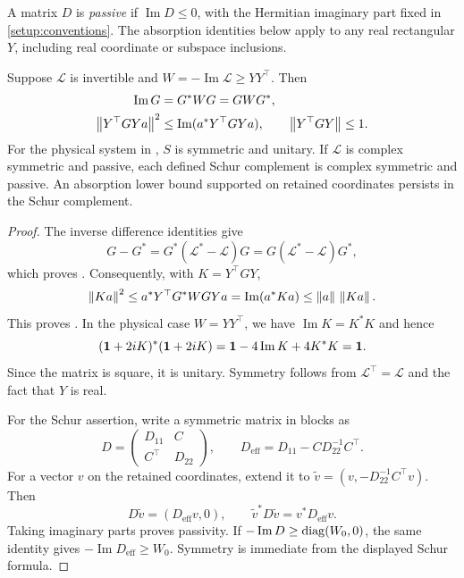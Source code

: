 A matrix $D$ is \emph{passive} if $\operatorname{Im}D\le0$, with the
Hermitian imaginary part fixed in \cref{setup:conventions}. The absorption
identities below apply to any real rectangular $Y$, including real
coordinate or subspace inclusions.

\begin{lemma}\label{mat:ward}
Suppose $\mathscr L$ is invertible and
$W=-\operatorname{Im}\mathscr L\ge YY^\top$. Then
\begin{align}
  \operatorname{Im}G&=G^*WG=GWG^*,
  \label{mat:ward-identity}\\
  \left\lVert Y^\top GYa\right\rVert^2
    &\le \operatorname{Im}(a^*Y^\top GYa),
  \qquad \left\lVert Y^\top GY\right\rVert\le1.
  \label{mat:ward-contraction}
\end{align}
For the physical system in , $S$ is symmetric and
unitary. If $\mathscr L$ is complex symmetric and passive, each defined
Schur complement is complex symmetric and passive. An absorption lower
bound supported on retained coordinates persists in the Schur complement.
\end{lemma}

\begin{proof}
The inverse difference identities give
\[
  G-G^*=G^*(\mathscr L^*-\mathscr L)G
        =G(\mathscr L^*-\mathscr L)G^*,
\]
which proves . Consequently, with $K=Y^\top GY$,
\[
 \left\lVert Ka\right\rVert^2
 \le a^*Y^\top G^*WGY a
 =\operatorname{Im}(a^*Ka)
 \le\left\lVert a\right\rVert\,\left\lVert Ka\right\rVert.
\]
This proves . In the physical case $W=YY^\top$,
we have $\operatorname{Im}K=K^*K$ and hence
\[
 (\mathbf 1+2iK)^*(\mathbf 1+2iK)
   =\mathbf 1-4\operatorname{Im}K+4K^*K=\mathbf 1.
\]
Since the matrix is square, it is unitary. Symmetry follows from
$\mathscr L^\top=\mathscr L$ and the fact that $Y$ is real.

For the Schur assertion, write a symmetric matrix in blocks as
\[
 D=\begin{pmatrix}D_{11}&C\\ C^\top&D_{22}\end{pmatrix},\qquad
 D_{\mathrm{eff}}=D_{11}-CD_{22}^{-1}C^\top.
\]
For a vector $v$ on the retained coordinates, extend it to
$\widetilde v=(v,-D_{22}^{-1}C^\top v)$. Then
\[
 D\widetilde v=(D_{\mathrm{eff}}v,0),\qquad
 \widetilde v^*D\widetilde v=v^*D_{\mathrm{eff}}v.
\]
Taking imaginary parts proves passivity. If
$-\operatorname{Im}D\ge\operatorname{diag}(W_0,0)$, the same identity gives
$-\operatorname{Im}D_{\mathrm{eff}}\ge W_0$. Symmetry is immediate from
the displayed Schur formula.
\end{proof}

